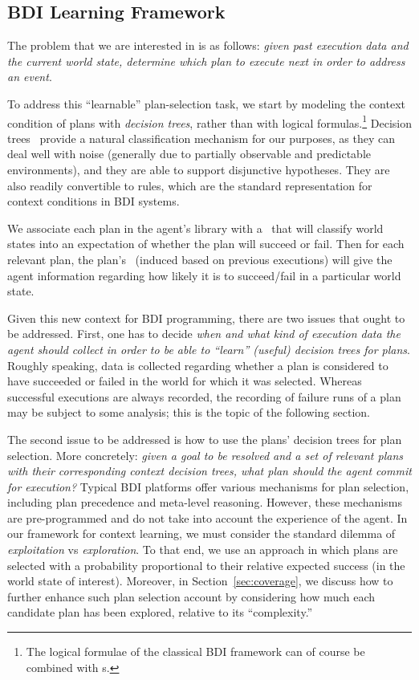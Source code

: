 \subsection{BDI Learning Framework}\label{sec:BDI_learning}


The problem that we are interested in is as follows: \emph{given past execution
data and the current world state, determine which plan to execute next 
in order to address an event}.


To address this ``learnable'' plan-selection task, we start by modeling the
context condition of plans with \emph{decision trees}, rather than with logical
formulas.\footnote{The logical formulae of the classical BDI framework can of course be combined with \dt s.}
Decision trees~\cite{Mitchell97:ML}  provide a natural classification mechanism
for our purposes, as they can deal well with noise (generally due to partially
observable and predictable environments), and they are able to support
disjunctive hypotheses. They are also readily convertible to rules, which are the
standard representation for context conditions in BDI systems.


We associate each plan in the agent's library with a \dt\ that will classify world
states into an expectation of whether the plan will succeed or fail. Then for
each relevant plan, the plan's \dt\ (induced based on previous executions) will
give the agent information regarding how likely it is to succeed/fail in a
particular world state.


Given this new context for BDI programming, there are two issues that ought to be
addressed.
First, one has to decide \emph{when and what kind of execution data the agent should
collect in order to be able to ``learn'' (useful) decision trees for plans}.
Roughly speaking, data is collected regarding whether a plan is considered to
have succeeded or failed in the world for which it was selected.
  Whereas successful executions are always recorded, the recording of failure
runs of a plan may be subject to some analysis; this is the topic of the following section.



The second issue to be addressed is how to use the plans' decision trees for plan
selection. More concretely: \emph{given a goal to be resolved and a set of
relevant plans with their corresponding context decision trees, what plan should
the agent commit for execution?}
Typical BDI platforms offer various mechanisms for plan selection, including plan
precedence and meta-level reasoning. However, these mechanisms are pre-programmed
and do not take into account the experience of the agent.
In our framework for context learning, we must consider the standard dilemma of
\emph{exploitation} vs \emph{exploration}. To that end, we use an 
approach in which plans are selected with a probability proportional to their relative expected
success (in the world state of interest). Moreover, in
Section~\ref{sec:coverage}, we discuss how to further enhance such plan selection
account by considering how much each candidate plan has been
explored, relative to its ``complexity.''




